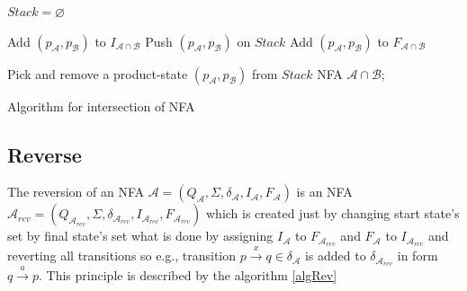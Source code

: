 \begin{algorithm}[H]
	\label{algIntersection}

  $Stack = \varnothing$\;

   {
    Add $(p_\mathcal{A},p_\mathcal{B})$ to $I_{\mathcal{A} \cap \mathcal{B}}$\;
    Push $(p_\mathcal{A},p_\mathcal{B})$ on $Stack$\; 
     {
      Add $(p_\mathcal{A},p_\mathcal{B})$ to $F_{\mathcal{A}\cap\mathcal{B}}$
    }
  }
	
   {
			Pick and remove a product-state $(p_\mathcal{A},p_\mathcal{B})$ from $Stack$\;
	 }
		\Return NFA $\mathcal{A}\cap\mathcal{B}$;
	\caption{Algorithm for intersection of NFA}
\end{algorithm}

\subsection{Reverse}
The reversion of an NFA $\mathcal{A}=(Q_\mathcal{A},\Sigma,\delta_\mathcal{A},I_\mathcal{A},F_\mathcal{A})$ is an NFA 
$\mathcal{A}_{rev}=(Q_{\mathcal{A}_{rev}},\Sigma,\delta_{\mathcal{A}_{rev}},I_{\mathcal{A}_{rev}},F_{\mathcal{A}_{rev}})$ 
which is created just by changing start state's set by final state's set what is done by
assigning $I_\mathcal{A}$ to $F_{\mathcal{A}_{rev}}$ and $F_\mathcal{A}$ to $I_{\mathcal{A}_{rev}}$ and reverting all transitions  so e.g., transition
$p\xrightarrow{x}q \in \delta_\mathcal{A}$ is added to $\delta_{\mathcal{A}_{rev}}$ in form $q\xrightarrow{a}p$. This principle is described by the algorithm
\ref{algRev}
\\

